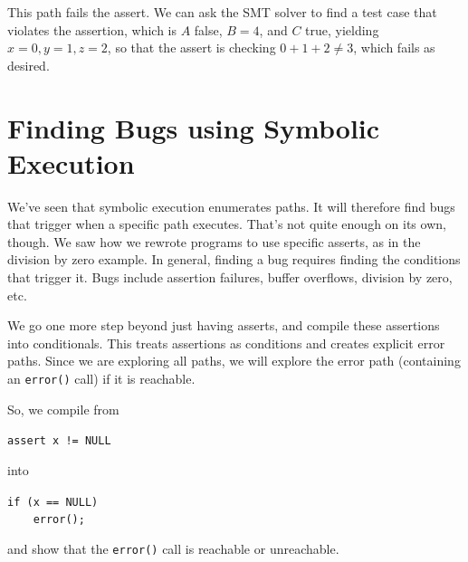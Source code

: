 \documentclass[11pt]{article}
\begin{document}
\begin{center}
\end{center}
This path fails the assert. We can ask the SMT solver to find a test case that violates the assertion, which is $A$ false, $B=4$, and $C$ true,
yielding $x = 0, y = 1, z = 2$, so that the assert is checking $0 + 1 + 2 \neq 3$, which fails as desired.

\section*{Finding Bugs using Symbolic Execution}
We've seen that symbolic execution enumerates paths. It will therefore find bugs that trigger when a specific path executes. That's not quite enough on its own, though.
We saw how we rewrote programs to use specific asserts, as in the division by zero example. In general, finding a bug requires finding the conditions that trigger it.
Bugs include assertion failures, buffer overflows, division by zero, etc.

We go one more step beyond just having asserts, and compile these assertions into conditionals. This treats assertions as conditions and creates explicit error paths. Since
we are exploring all paths, we will explore the error path (containing an \texttt{error()} call) if it is reachable.

So, we compile from
\begin{center}
  \texttt{assert x != NULL}
\end{center}
into
\begin{center}
  \texttt{if (x == NULL)}\\
  \texttt{~~~~error();}
\end{center}
and show that the \texttt{error()} call is reachable or unreachable.





\end{document}
